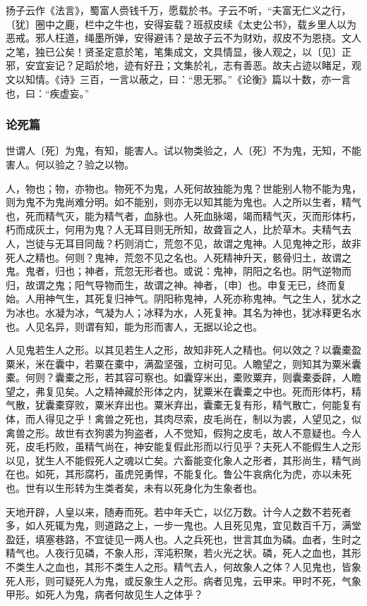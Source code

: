 \documentclass[]{article}
\begin{document}
扬子云作《法言》，蜀富人赍钱千万，愿载於书。子云不听，``夫富无仁义之行，〔犹〕圈中之鹿，栏中之牛也，安得妄载？班叔皮续《太史公书》，载乡里人以为恶戒。邪人枉道，绳墨所弹，安得避讳？是故子云不为财劝，叔皮不为恩挠。文人之笔，独已公矣！贤圣定意於笔，笔集成文，文具情显，後人观之，以〔见〕正邪，安宜妄记？足蹈於地，迹有好丑；文集於礼，志有善恶。故夫占迹以睹足，观文以知情。《诗》三百，一言以蔽之，曰：``思无邪。''《论衡》篇以十数，亦一言也，曰：``疾虚妄。''

\hypertarget{header-n798}{%
\subsubsection{论死篇}\label{header-n798}}

世谓人〔死〕为鬼，有知，能害人。试以物类验之，人〔死〕不为鬼，无知，不能害人。何以验之？验之以物。

人，物也；物，亦物也。物死不为鬼，人死何故独能为鬼？世能别人物不能为鬼，则为鬼不为鬼尚难分明。如不能别，则亦无以知其能为鬼也。人之所以生者，精气也，死而精气灭，能为精气者，血脉也。人死血脉竭，竭而精气灭，灭而形体朽，朽而成灰土，何用为鬼？人无耳目则无所知，故聋盲之人，比於草木。夫精气去人，岂徒与无耳目同哉？朽则消亡，荒忽不见，故谓之鬼神。人见鬼神之形，故非死人之精也。何则？鬼神，荒忽不见之名也。人死精神升天，骸骨归土，故谓之鬼。鬼者，归也；神者，荒忽无形者也。或说：鬼神，阴阳之名也。阴气逆物而归，故谓之鬼；阳气导物而生，故谓之神。神者，〔申〕也。申复无已，终而复始。人用神气生，其死复归神气。阴阳称鬼神，人死亦称鬼神。气之生人，犹水之为冰也。水凝为冰，气凝为人；冰释为水，人死复神。其名为神也，犹冰释更名水也。人见名异，则谓有知，能为形而害人，无据以论之也。

人见鬼若生人之形。以其见若生人之形，故知非死人之精也。何以效之？以囊橐盈粟米，米在囊中，若粟在橐中，满盈坚强，立树可见。人瞻望之，则知其为粟米囊橐。何则？囊橐之形，若其容可察也。如囊穿米出，橐败粟弃，则囊橐委辟，人瞻望之，弗复见矣。人之精神藏於形体之内，犹粟米在囊橐之中也。死而形体朽，精气散，犹囊橐穿败，粟米弃出也。粟米弃出，囊橐无复有形，精气散亡，何能复有体，而人得见之乎！禽兽之死也，其肉尽索，皮毛尚在，制以为裘，人望见之，似禽兽之形。故世有衣狗裘为狗盗者，人不觉知，假狗之皮毛，故人不意疑也。今人死，皮毛朽败，虽精气尚在，神安能复假此形而以行见乎？夫死人不能假生人之形以见，犹生人不能假死人之魂以亡矣。六畜能变化象人之形者，其形尚生，精气尚在也。如死，其形腐朽，虽虎兕勇悍，不能复化。鲁公牛哀病化为虎，亦以未死也。世有以生形转为生类者矣，未有以死身化为生象者也。

天地开辟，人皇以来，随寿而死。若中年夭亡，以亿万数。计今人之数不若死者多，如人死辄为鬼，则道路之上，一步一鬼也。人且死见鬼，宜见数百千万，满堂盈廷，填塞巷路，不宜徒见一两人也。人之兵死也，世言其血为磷。血者，生时之精气也。人夜行见磷，不象人形，浑沌积聚，若火光之状。磷，死人之血也，其形不类生人之血也，其形不类生人之形。精气去人，何故象人之体？人见鬼也，皆象死人形，则可疑死人为鬼，或反象生人之形。病者见鬼，云甲来。甲时不死，气象甲形。如死人为鬼，病者何故见生人之体乎？
\end{document}
